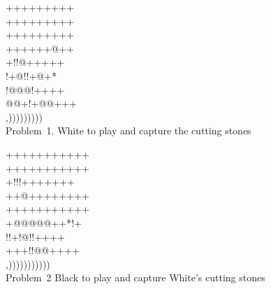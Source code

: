 \documentclass[mcrownvopaper,10pt,twopage,onecolumn,final]{memoir}
\begin{document}
\begin{figure}[ht]
    \begin{minipage}[c]{0.5\linewidth}
        \centering    
        {\gnos%
        +++++++++\\
        +++++++++\\
        +++++++++\\
        ++++++@++\\
        +!!@+++++\\
        !+@!!+@+*\\
        !@@@!++++\\
        @@+!+@@+++\\
        ,)))))))))\\
        }
        Problem\ 1. White to play and capture the cutting stones
    \end{minipage}%
    \begin{minipage}[c]{0.5\linewidth}
        \centering    
        {\gnos%
        +++++++++++\\
        +++++++++++\\
        +!!!+++++++\\
        ++@++++++++\\
        +++++++++++\\
        +@@@@@++*!+\\
        !!+!@!!++++\\
        +++!!@@++++\\
        ,)))))))))))\\
        }
        Problem\ 2 Black to play and capture White's cutting stones
    \end{minipage}
\end{figure}
\end{document}
